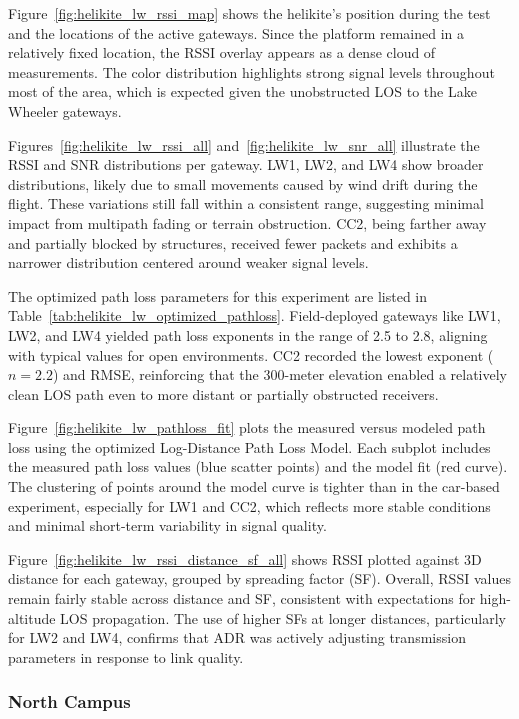\documentclass[journal]{IEEEtran}
\begin{document}
Figure~\ref{fig:helikite_lw_rssi_map} shows the helikite’s position during the test and the locations of the active gateways. Since the platform remained in a relatively fixed location, the RSSI overlay appears as a dense cloud of measurements. The color distribution highlights strong signal levels throughout most of the area, which is expected given the unobstructed LOS to the Lake Wheeler gateways.

Figures~\ref{fig:helikite_lw_rssi_all} and~\ref{fig:helikite_lw_snr_all} illustrate the RSSI and SNR distributions per gateway. LW1, LW2, and LW4 show broader distributions, likely due to small movements caused by wind drift during the flight. These variations still fall within a consistent range, suggesting minimal impact from multipath fading or terrain obstruction. CC2, being farther away and partially blocked by structures, received fewer packets and exhibits a narrower distribution centered around weaker signal levels.

The optimized path loss parameters for this experiment are listed in Table~\ref{tab:helikite_lw_optimized_pathloss}. Field-deployed gateways like LW1, LW2, and LW4 yielded path loss exponents in the range of 2.5 to 2.8, aligning with typical values for open environments. CC2 recorded the lowest exponent ($n = 2.2$) and RMSE, reinforcing that the 300-meter elevation enabled a relatively clean LOS path even to more distant or partially obstructed receivers.

Figure~\ref{fig:helikite_lw_pathloss_fit} plots the measured versus modeled path loss using the optimized Log-Distance Path Loss Model. Each subplot includes the measured path loss values (blue scatter points) and the model fit (red curve). The clustering of points around the model curve is tighter than in the car-based experiment, especially for LW1 and CC2, which reflects more stable conditions and minimal short-term variability in signal quality.

Figure~\ref{fig:helikite_lw_rssi_distance_sf_all} shows RSSI plotted against 3D distance for each gateway, grouped by spreading factor (SF). Overall, RSSI values remain fairly stable across distance and SF, consistent with expectations for high-altitude LOS propagation. The use of higher SFs at longer distances, particularly for LW2 and LW4, confirms that ADR was actively adjusting transmission parameters in response to link quality.





\subsubsection{North Campus}
\end{document}
